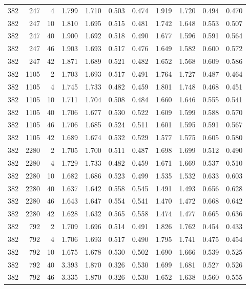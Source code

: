 \documentclass[journal=jacsat,manuscript=article]{achemso}
\begin{document}
\begin{table}
\begin{tabular}{rrr|rrrr|rrrr}
382 & 247 & 4 & 1.799 & 1.710 & 0.503 & 0.474 & 1.919 & 1.720 & 0.494 & 0.470\\
382 & 247 & 10 & 1.810 & 1.695 & 0.515 & 0.481 & 1.742 & 1.648 & 0.553 & 0.507\\
382 & 247 & 40 & 1.900 & 1.692 & 0.518 & 0.490 & 1.677 & 1.596 & 0.591 & 0.564\\
382 & 247 & 46 & 1.903 & 1.693 & 0.517 & 0.476 & 1.649 & 1.582 & 0.600 & 0.572\\
382 & 247 & 42 & 1.871 & 1.689 & 0.521 & 0.482 & 1.652 & 1.568 & 0.609 & 0.586\\
382 & 1105 & 2 & 1.703 & 1.693 & 0.517 & 0.491 & 1.764 & 1.727 & 0.487 & 0.464\\
382 & 1105 & 4 & 1.745 & 1.733 & 0.482 & 0.459 & 1.801 & 1.748 & 0.468 & 0.451\\
382 & 1105 & 10 & 1.711 & 1.704 & 0.508 & 0.484 & 1.660 & 1.646 & 0.555 & 0.541\\
382 & 1105 & 40 & 1.706 & 1.677 & 0.530 & 0.522 & 1.609 & 1.599 & 0.588 & 0.570\\
382 & 1105 & 46 & 1.706 & 1.685 & 0.524 & 0.511 & 1.601 & 1.595 & 0.591 & 0.567\\
382 & 1105 & 42 & 1.689 & 1.674 & 0.532 & 0.529 & 1.577 & 1.575 & 0.605 & 0.580\\
382 & 2280 & 2 & 1.705 & 1.700 & 0.511 & 0.487 & 1.698 & 1.699 & 0.512 & 0.490\\
382 & 2280 & 4 & 1.729 & 1.733 & 0.482 & 0.459 & 1.671 & 1.669 & 0.537 & 0.510\\
382 & 2280 & 10 & 1.682 & 1.686 & 0.523 & 0.499 & 1.535 & 1.532 & 0.633 & 0.603\\
382 & 2280 & 40 & 1.637 & 1.642 & 0.558 & 0.545 & 1.491 & 1.493 & 0.656 & 0.628\\
382 & 2280 & 46 & 1.643 & 1.647 & 0.554 & 0.541 & 1.470 & 1.472 & 0.668 & 0.642\\
382 & 2280 & 42 & 1.628 & 1.632 & 0.565 & 0.558 & 1.474 & 1.477 & 0.665 & 0.636\\
382 & 792 & 2 & 1.709 & 1.696 & 0.514 & 0.491 & 1.826 & 1.762 & 0.454 & 0.433\\
382 & 792 & 4 & 1.706 & 1.693 & 0.517 & 0.490 & 1.795 & 1.741 & 0.475 & 0.454\\
382 & 792 & 10 & 1.675 & 1.678 & 0.530 & 0.502 & 1.690 & 1.666 & 0.539 & 0.525\\
382 & 792 & 40 & 3.393 & 1.870 & 0.326 & 0.530 & 1.699 & 1.681 & 0.527 & 0.526\\
382 & 792 & 46 & 3.335 & 1.870 & 0.326 & 0.530 & 1.652 & 1.638 & 0.560 & 0.555\\

\end{tabular}
\end{table}
\end{document}
